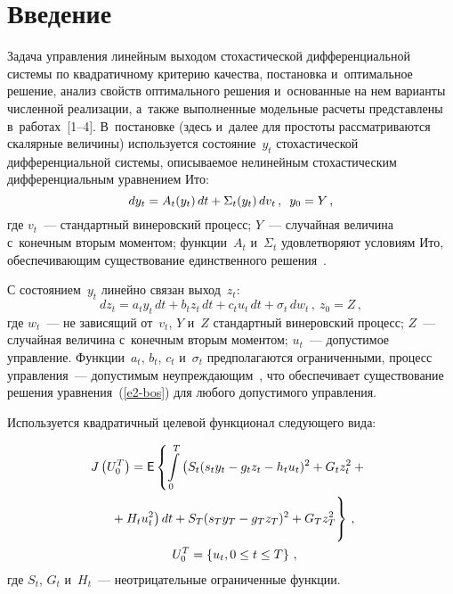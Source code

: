  



\thispagestyle{headings}

\begin{multicols}{2}

\label{st\stat}



\section{Введение}

     Задача управления линейным выходом стохастической 
дифференциальной системы по квадратичному критерию качества, 
постановка и~оптимальное решение, анализ свойств оптимального решения 
и~основанные на нем варианты численной реализации, а~также 
выполненные модельные расчеты представлены в~работах~[1--4]. 
В~постановке (здесь и~далее для простоты рассматриваются скалярные 
величины) используется состояние~$y_t$ стохастической дифференциальной 
системы, описываемое нелинейным стохастическим дифференциальным 
уравнением Ито:
     \begin{equation}
     dy_t=A_t(y_t)\,dt+\Sigma_t(y_t)\,dv_t\,,\enskip y_0=Y\,,
     \label{e1-bos}
     \end{equation}
где $v_t$~--- стандартный винеровский процесс; $Y$~--- случайная величина 
с~конечным вторым моментом; функции~$A_t$ и~$\Sigma_t$ удовлетворяют 
условиям Ито, обеспечивающим существование единственного 
решения~\cite{5-bos}.

     С состоянием~$y_t$ линейно связан выход~$z_t$:
     \begin{equation}
     dz_t= a_ty_t\,dt+b_tz_t\,dt+c_tu_t\,dt+\sigma_t\,dw_t\,,\  z_0=Z\,,
     \label{e2-bos}
     \end{equation}
где $w_t$~--- не зависящий от~$v_t$, $Y$ и~$Z$ стандартный винеровский 
процесс; $Z$~--- случайная величина с~конечным вторым моментом; 
$u_t$~--- допустимое управление. Функции~$a_t$, $b_t$, $c_t$ и~$\sigma_t$ 
предполагаются ограниченными, процесс управления~--- допустимым 
неупреждающим~\cite{5-bos}, что обеспечивает существование решения 
уравнения~(\ref{e2-bos}) для любого допустимого управления.

     Используется квадратичный целевой функционал следующего вида:
     
     \noindent
     \begin{multline}
    \!\! J\left( U_0^T\right)={\sf E}\left\{ \int\limits_0^T 
\left( S_t(s_ty_t-g_tz_t-h_tu_t)^2+G_tz_t^2+{}\!\right.\right.\\
\left.\left.{}+H_tu_t^2\right)dt+S_T(s_Ty_T-g_Tz_T)^2+G_Tz_T^2
\vphantom{\int\limits_0^T }
     \right\}\,,\\
     \enskip
     U_0^T=\left\{ u_t,0\leq t\leq T\right\}\,,
     \label{e3-bos}
     \end{multline}
где $S_t$, $G_t$ и~$H_t$~--- неотрицательные ограниченные функции.
     

\end{multicols}
